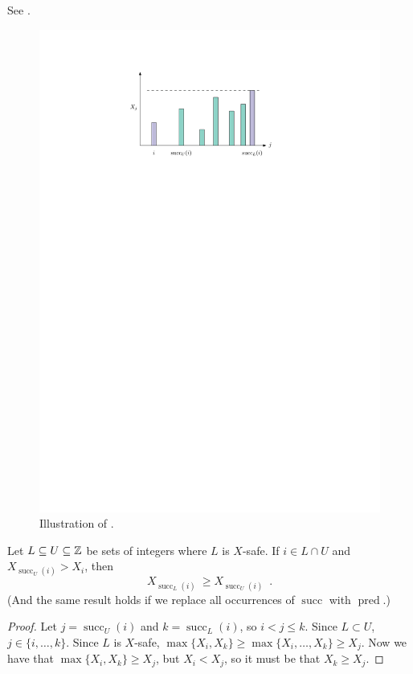 \documentclass{patmorin}
\DeclareMathOperator{\cw}{succ}
\DeclareMathOperator{\ccw}{pred}
\begin{document}
See .
\begin{figure}
   \begin{center}
      \includegraphics{figs/domination-i}
   \end{center}
   \caption{Illustration of .}
\end{figure}

\begin{lem}
   Let $L\subseteq U\subseteq\mathbb{Z}$ be sets of integers where $L$
   is $X$-safe.  If $i\in L\cap U$ and $X_{\cw_U(i)} > X_i$, then
   \[
         X_{\cw_L(i)}\ \ge X_{\cw_U(i)} \enspace . 
   \]
   (And the same result holds if we replace all occurrences of $\cw$
   with $\ccw$.)
\end{lem}

\begin{proof}
   Let $j = \cw_U(i)$ and $k=\cw_L(i)$, so $i < j \le k$.
   Since $L\subset U$, $j\in \{i,\ldots,k\}$.  Since $L$ is $X$-safe,
   $\max\{X_i,X_k\} \ge \max\{X_i,\ldots,X_k\} \ge X_j$.  Now we have
   that $\max\{X_i,X_k\} \ge X_j$, but $X_i < X_j$, so it must be that
   $X_k\ge X_j$.
\end{proof}
\end{document}
